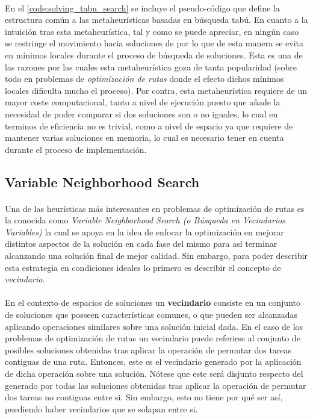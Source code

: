 \documentclass{subfiles}
\begin{document}
        \paragraph{}
        En el \cref{code:solving_tabu_search} se incluye el pseudo-código que define la estructura común a las metaheurísticas basadas en búsqueda tabú. En cuanto a la intuición tras esta metaheurística, tal y como se puede apreciar, en ningún caso se restringe el movimiento hacia soluciones de  por lo que de esta manera se evita  en mínimos locales durante el proceso de búsqueda de soluciones. Esta es una de las razones por las cuales esta metaheurística goza de tanta popularidad (sobre todo en problemas de \emph{optimización de rutas} donde el efecto dichos mínimos locales dificulta mucho el proceso). Por contra, esta metaheurística requiere de un mayor coste computacional, tanto a nivel de ejecución puesto que añade la necesidad de poder comparar si dos soluciones son o no iguales, lo cual en terminos de eficiencia no es trivial, como a nivel de espacio ya que requiere de mantener varias soluciones en memoria, lo cual es necesario tener en cuenta durante el proceso de implementación.

      \subsection{Variable Neighborhood Search}
      \label{sec:solving_vns}

        \paragraph{}
        Una de las heurísticas más interesantes en problemas de optimización de rutas es la conocida como \emph{Variable Neighborhood Search (o Búsqueda en Vecindarios Variables)} la cual se apoya en la idea de enfocar la optimización en mejorar distintos aspectos de la solución en cada fase del mismo para así terminar alcanzando una solución final de mejor calidad. Sin embargo, para poder describir esta estrategia en condiciones ideales lo primero es describir el concepto de \emph{vecindario}.

        \paragraph{}
        En el contexto de espacios de soluciones un \textbf{vecindario} consiste en un conjunto de soluciones que posseen características comunes, o que pueden ser alcanzadas aplicando operaciones similares sobre una solución inicial dada. En el caso de los problemas de optimización de rutas un vecindario puede referirse al conjunto de posibles soluciones obtenidas tras aplicar la operación de permutar dos tareas contiguas de una ruta. Entonces, este es el vecindario generado por la aplicación de dicha operación sobre una solución. Nótese que este será disjunto respecto del generado por todas las soluciones obtenidas tras aplicar la operación de permutar dos tareas no contiguas entre si. Sin embargo, esto no tiene por qué ser así, puediendo haber vecindarios que se solapan entre si.
\end{document}
